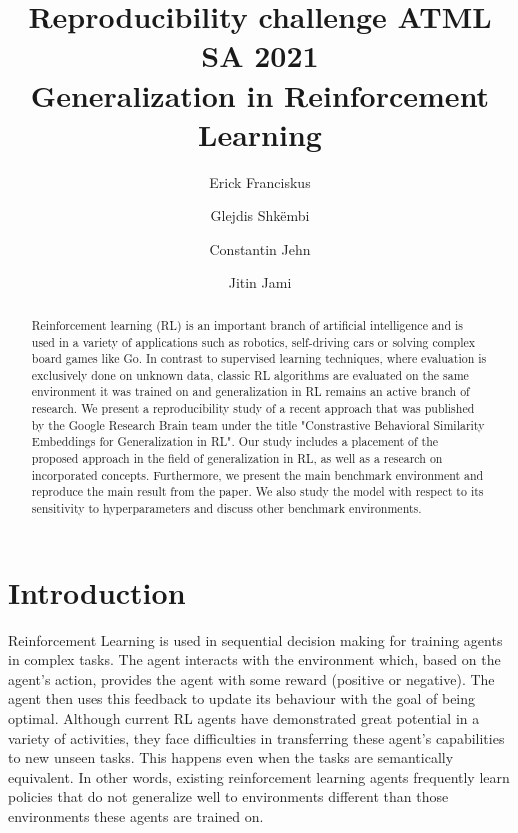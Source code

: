 \documentclass{usiinftr}
\begin{document}
\title{\bf Reproducibility challenge ATML SA 2021 \\ {\normalfont Generalization in Reinforcement Learning}}
\author{Erick Franciskus}{\ddagger}
\author{Glejdis Shk\"embi}{\ddagger}
\author{Constantin Jehn}{\ddagger}
\author{Jitin Jami}{\ddagger}




%
%

\maketitle
\begin{abstract}
Reinforcement learning (RL) is an important branch of artificial intelligence and is used in a variety of applications such as robotics, self-driving cars or solving complex board games like Go.
In contrast to supervised learning techniques, where evaluation is exclusively done on unknown data, classic RL algorithms are evaluated on the same environment it was trained on and generalization in RL remains an active branch of research.
We present a reproducibility study of a recent approach that was published by the Google Research Brain team under the title "Constrastive Behavioral Similarity Embeddings for Generalization in RL".
Our study includes a placement of the proposed approach in the field of generalization in RL, as well as a research on incorporated concepts.
Furthermore, we present the main benchmark environment and reproduce the main result from the paper.
We also study the model with respect to its sensitivity to hyperparameters and discuss other benchmark environments.


\end{abstract}

\section{Introduction}
Reinforcement Learning is used in sequential decision making for training agents in complex tasks. The agent interacts with the environment which, based on the agent's action, provides the agent with some reward (positive or negative). The agent then uses this feedback to update its behaviour with the goal of being optimal. Although current RL agents have demonstrated great potential in a variety of activities, they face difficulties in transferring these agent's capabilities to new unseen tasks. This happens even when the tasks are semantically equivalent. In other words, existing reinforcement learning agents frequently learn policies that do not generalize well to environments different than those environments these agents are trained on.
\end{document}
